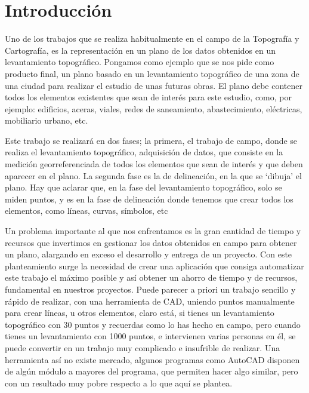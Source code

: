 \section{Introducción}
Uno de los trabajos que se realiza habitualmente en el campo de la Topografía y Cartografía, es la representación en un plano de los datos obtenidos en un levantamiento topográfico. Pongamos como ejemplo que se nos pide como producto final, un plano basado en un levantamiento topográfico de una zona de una ciudad para realizar el estudio de unas futuras obras. El plano debe contener todos los elementos existentes que sean de interés para este estudio, como, por ejemplo: edificios, aceras, viales, redes de saneamiento, abastecimiento, eléctricas, mobiliario urbano, etc.

Este trabajo se realizará en dos fases; la primera, el trabajo de campo, donde se realiza el levantamiento topográfico, adquisición de datos, que consiste en la medición georreferenciada de todos los elementos que sean de interés y que deben aparecer en el plano. La segunda fase es la de delineación, en la que se ‘dibuja’ el plano. Hay que aclarar que, en la fase del levantamiento topográfico, solo se miden puntos, y es en la fase de delineación donde tenemos que crear todos los elementos, como líneas, curvas, símbolos, etc   

Un problema importante al que nos enfrentamos es la gran cantidad de tiempo y recursos que invertimos en gestionar los datos obtenidos en campo para obtener un plano, alargando en exceso el desarrollo y entrega de un proyecto.
Con este planteamiento surge la necesidad de crear una aplicación que consiga automatizar este trabajo el máximo posible y así obtener un ahorro de tiempo y de recursos, fundamental en nuestros proyectos.
Puede parecer a priori un trabajo sencillo y rápido de realizar, con una herramienta de CAD, uniendo puntos manualmente para crear líneas, u otros elementos, claro está, si tienes un levantamiento topográfico con 30 puntos y recuerdas como lo has hecho en campo, pero cuando tienes un levantamiento con 1000 puntos, e intervienen varias personas en él, se puede convertir en un trabajo muy complicado e insufrible de realizar.
Una herramienta así no existe mercado, algunos programas como AutoCAD disponen de algún módulo a mayores del programa, que permiten hacer algo similar, pero con un resultado muy pobre respecto a lo que aquí se plantea.

